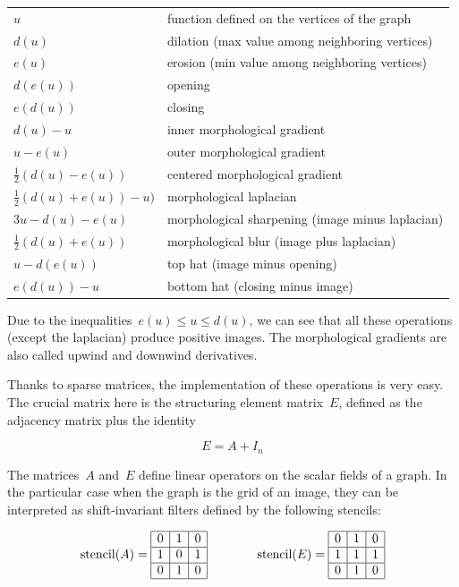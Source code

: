 \begin{tabular}{ll}
	$u$ & function defined on the vertices of the graph \\
	$d(u)$ & dilation (max value among neighboring vertices) \\
	$e(u)$ & erosion (min value among neighboring vertices) \\
	$d(e(u))$ & opening \\
	$e(d(u))$ & closing \\
	$d(u) - u$ & inner morphological gradient \\
	$u - e(u)$ & outer morphological gradient \\
	$\frac12(d(u) - e(u))$ & centered morphological gradient \\
	$\frac12(d(u) + e(u)) - u)$ & morphological laplacian \\
	$3u - d(u) - e(u)$ & morphological sharpening (image minus laplacian) \\
	$\frac12(d(u) + e(u))$ & morphological blur (image plus laplacian) \\
	$u - d(e(u))$ & top hat (image minus opening) \\
	$e(d(u)) -u$ & bottom hat (closing minus image) \\
\end{tabular}

Due to the inequalities~$e(u)\le u\le d(u)$, we can see that all these
operations (except the laplacian) produce positive images.  The morphological
gradients are also called upwind and downwind derivatives.

Thanks to sparse matrices, the implementation of these operations is very
easy.  The crucial matrix here is the structuring element matrix~$E$, defined
as the adjacency matrix plus the identity

$$
E = A + I_n
$$

The matrices~$A$ and~$E$ define linear operators on the scalar fields of a
graph.  In the particular case when the graph is the grid of an image, they
can be interpreted as shift-invariant filters defined by the following
stencils:

$$
\mathrm{stencil}(A)=
\begin{array}{|c|c|c|}\hline0&1&0\\\hline1&0&1\\\hline0&1&0\\\hline\end{array}
	\qquad
	\qquad
\mathrm{stencil}(E)=
\begin{array}{|c|c|c|}\hline0&1&0\\\hline1&1&1\\\hline0&1&0\\\hline\end{array}
$$

